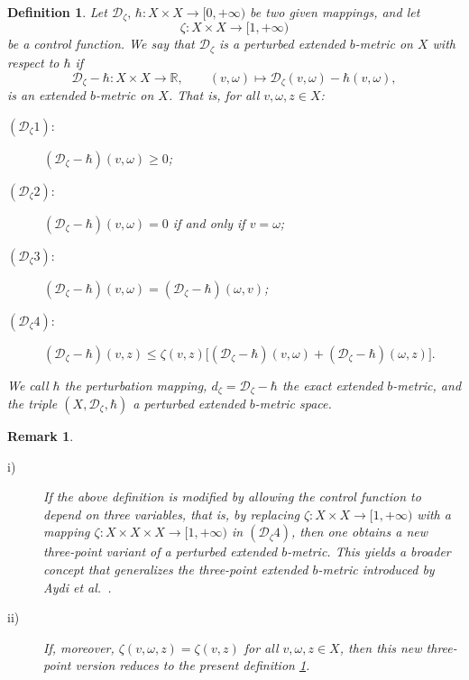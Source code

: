 \documentclass[sn-mathphys-num]{sn-jnl}%
\theoremstyle{thmstyleone}%
\theoremstyle{thmstyletwo}%
\newtheorem{remark}{Remark}%
\theoremstyle{thmstylethree}%
\newtheorem{definition}{Definition}
\numberwithin{equation}{section}
\begin{document}
\vspace{0.2cm}
\begin{definition}\label{prensentdef}
Let $\mathcal{D}_{\zeta},\, \hbar : X \times X \to [0,+\infty)$ be two given mappings, 
and let 
\[
\zeta : X \times X \to [1,+\infty)
\]
be a control function. We say that $\mathcal{D}_{\zeta}$ is a 
\textit{perturbed extended $b$-metric} on $X$ with respect to $\hbar$ if 
\[
\mathcal{D}_{\zeta} - \hbar : X \times X \to \mathbb{R},
\qquad
(v,\omega) \longmapsto \mathcal{D}_{\zeta}(v,\omega) - \hbar(v,\omega),
\]
is an extended $b$-metric on $X$. That is, for all $v,\omega,z \in X$:
\begin{description}
    \item[$(\mathcal{D}_{\zeta}1):$] $(\mathcal{D}_{\zeta} - \hbar)(v,\omega) \ge 0$;
    \item[$(\mathcal{D}_{\zeta}2):$] $(\mathcal{D}_{\zeta} - \hbar)(v,\omega) = 0$ if and only if $v=\omega$;
    \item[$(\mathcal{D}_{\zeta}3):$] $(\mathcal{D}_{\zeta} - \hbar)(v,\omega)
           = (\mathcal{D}_{\zeta} - \hbar)(\omega,v)$;
    \item[$(\mathcal{D}_{\zeta}4):$] \(
    (\mathcal{D}_{\zeta} - \hbar)(v,z)
    \le 
    \zeta(v,z)\Big[
    (\mathcal{D}_{\zeta} - \hbar)(v,\omega)
    +
    (\mathcal{D}_{\zeta} - \hbar)(\omega,z)
    \Big].
    \)
\end{description}

We call $\hbar$ the \textit{perturbation mapping}, \(
d_{\zeta} = \mathcal{D}_{\zeta} - \hbar
\)
the \textit{exact extended $b$-metric}, 
and the triple $(X,\mathcal{D}_{\zeta},\hbar)$ a 
\textit{perturbed extended $b$-metric space}.
\end{definition}
\vspace{0.2cm}
\begin{remark}
\begin{description}\item[]
    \item[i)] If the above definition is modified by allowing the control function 
to depend on three variables, that is, by replacing 
$\zeta : X \times X \to [1,+\infty)$ with a mapping 
$\zeta : X \times X \times X \to [1,+\infty)$ in $(\mathcal{D}_{\zeta}4)$, 
then one obtains a new three-point variant of a perturbed extended $b$-metric.  
This yields a broader concept that generalizes the three-point extended 
$b$-metric introduced by Aydi et al.~\cite{Aydi}.

    \item[ii)] If, moreover, $\zeta(v,\omega,z)=\zeta(v,z)$ for all $v,\omega,z\in X$, 
then this new three-point version reduces to the present definition \ref{prensentdef}.
\end{description}

\end{remark}
\vspace{0.2cm}
\end{document}
